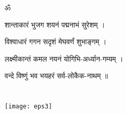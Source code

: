 \documentclass[12pt]{book}
\begin{document}

\tableofcontents



















\begin{center}
ॐ

शान्ताकारं भुजग शयनं पद्मनाभं सुरेशम्  ।  

विश्वाधारं गगन सदृशं मेघवर्णं शुभाङ्गम्  ।  

लक्ष्मीकान्तं कमल नयनं योगिभि-अर्ध्यान-गम्यम्  ।  

वन्दे विष्णुं भव भयहरं सर्व-लोकैक-नाथम्  ॥ 

\end{center}
\newpage

\chapter*{}
\begin{center}
\texttt{[image: eps3]}
\end{center}

\end{document}
